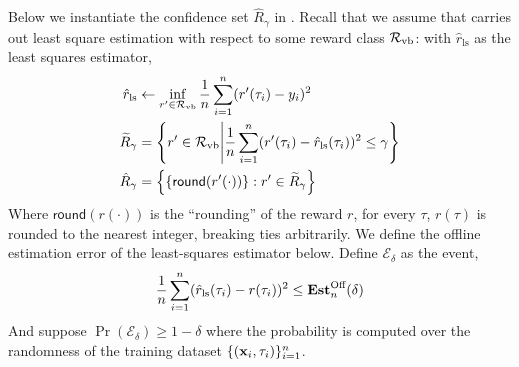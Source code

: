 Below we instantiate the confidence set $\hat{R}_\gamma$ in . Recall that we assume that  carries out least square estimation with respect to some reward class ${\mathcal{R}}_{\text{vb}}$: with $\hat{r}_{\text{ls}}$ as the least squares estimator,
\begin{align*}
    \hat{r}_{\text{ls}} &\gets \inf_{r' \in {\mathcal{R}}_{\text{vb}}} \frac{1}{n} \sum_{i=1}^n (r'(\tau_i) - y_i)^2 \\
    \widetilde{R}_\gamma &= \left\{ r' \in {\mathcal{R}}_{\text{vb}} \middle| \frac{1}{n} \sum_{i=1}^n (r'(\tau_i) - \hat{r}_{\text{ls}} (\tau_i))^2 \le \gamma \right\} \\
    \hat{R}_\gamma &= \left\{ \{ \textsf{round} (r'(\cdot)) \} : r' \in \widetilde{R}_\gamma \right\}
\end{align*}
Where $\textsf{round} (r(\cdot))$ is the ``rounding'' of the reward $r$, for every $\tau$, $r(\tau)$ is rounded to the nearest integer, breaking ties arbitrarily. We define the offline estimation error of the least-squares estimator below. Define $\mathcal{E}_\delta$ as the event,
\begin{align} \label{eq:estoff}
    \frac{1}{n} \sum_{i=1}^n (\hat{r}_{\text{ls}} (\tau_i) - r (\tau_i))^2 \le \textbf{Est}^{\text{Off}}_n (\delta)
\end{align}
And suppose $\Pr (\mathcal{E}_\delta) \ge 1-\delta$ where the probability is computed over the randomness of the training dataset $\{ (\mathbf{x}_i,\tau_i) \}_{i=1}^n$.

